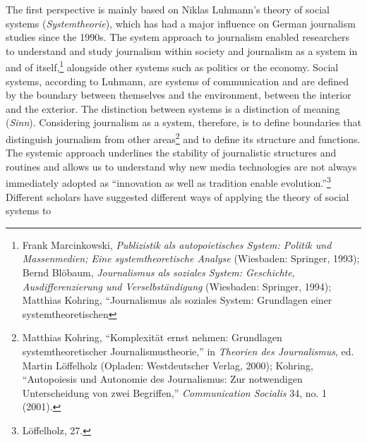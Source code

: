 \documentclass{tufte-handout}
\begin{document}
The first perspective is mainly based on Niklas Luhmann's theory of
social systems (\emph{Systemtheorie}), which has had a major influence
on German journalism studies since the 1990s. The system approach to
journalism enabled researchers to understand and study journalism within
society and journalism as a system in and of itself,\footnote{Frank
  Marcinkowski, \emph{Publizistik als autopoietisches System: Politik
  und Massenmedien; Eine systemtheoretische Analyse} (Wiesbaden:
  Springer, 1993); Bernd Blöbaum, \emph{Journalismus als soziales
  System: Geschichte, Ausdifferenzierung und Verselbständigung}
  (Wiesbaden: Springer, 1994); Matthias Kohring, ``Journalismus als
  soziales System: Grundlagen einer systemtheoretischen} alongside other systems such as politics
or the economy. Social systems, according to Luhmann, are systems of
communication and are defined by the boundary between themselves and the
environment, between the interior and the exterior. The distinction
between systems is a distinction of meaning (\emph{Sinn}). Considering
journalism as a system, therefore, is to define boundaries that
distinguish journalism from other areas\footnote{Matthias Kohring,
  ``Komplexität ernst nehmen: Grundlagen systemtheoretischer
  Journalismustheorie,'' in \emph{Theorien des Journalismus}, ed. Martin
  Löffelholz (Opladen: Westdeutscher Verlag, 2000); Kohring,
  ``Autopoiesis und Autonomie des Journalismus: Zur notwendigen
  Unterscheidung von zwei Begriffen,'' \emph{Communication Socialis} 34,
  no. 1 (2001).} and to define its structure and functions. The systemic
approach underlines the stability of journalistic structures and
routines and allows us to understand why new media technologies are not
always immediately adopted as ``innovation as well as tradition enable
evolution.''\footnote{Löffelholz, 27.} Different scholars have suggested
different ways of applying the theory of social systems to
\end{document}

